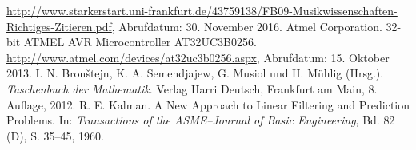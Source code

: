 \begin{thebibliography}{99}
 \url{http://www.starkerstart.uni-frankfurt.de/43759138/FB09-Musikwissenschaften-Richtiges-Zitieren.pdf}, Abrufdatum: 30. November 2016.
 Atmel Corporation. 32-bit ATMEL AVR Microcontroller AT32UC3B0256. \url{http://www.atmel.com/devices/at32uc3b0256.aspx}, Abrufdatum: 15. Oktober 2013.
 I. N. Bron\v{s}tejn, K. A. Semendjajew, G. Musiol und H. Mühlig (Hrsg.). {\itshape Taschenbuch der Mathematik}. Verlag Harri Deutsch, Frankfurt am Main, 8. Auflage, 2012.
 R. E. Kalman. A New Approach to Linear Filtering and Prediction Problems. In: {\itshape Transactions of the ASME--Journal of Basic Engineering}, Bd. 82 (D), S. 35--45, 1960.
\end{thebibliography}